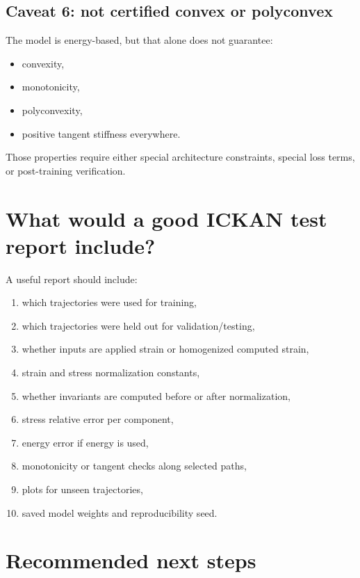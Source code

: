 \documentclass[11pt]{article}
\begin{document}
\subsection{Caveat 6: not certified convex or polyconvex}

The model is energy-based, but that alone does not guarantee:

\begin{itemize}[leftmargin=2em]
  \item convexity,
  \item monotonicity,
  \item polyconvexity,
  \item positive tangent stiffness everywhere.
\end{itemize}

Those properties require either special architecture constraints, special loss
terms, or post-training verification.

\section{What would a good ICKAN test report include?}

A useful report should include:

\begin{enumerate}[leftmargin=2em]
  \item which trajectories were used for training,
  \item which trajectories were held out for validation/testing,
  \item whether inputs are applied strain or homogenized computed strain,
  \item strain and stress normalization constants,
  \item whether invariants are computed before or after normalization,
  \item stress relative error per component,
  \item energy error if energy is used,
  \item monotonicity or tangent checks along selected paths,
  \item plots for unseen trajectories,
  \item saved model weights and reproducibility seed.
\end{enumerate}

\section{Recommended next steps}
\end{document}
